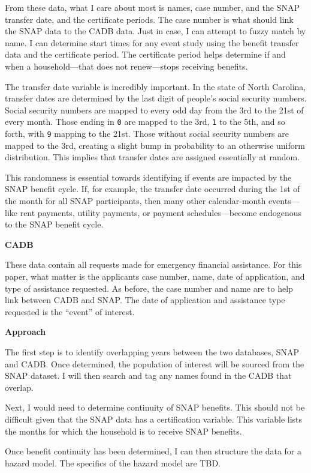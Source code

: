 \documentclass[12pt,letterpaperpaper,]{book}
\begin{document}
From these data, what I care about most is names, case number, and the
SNAP transfer date, and the certificate periods. The case number is what
should link the SNAP data to the CADB data. Just in case, I can attempt
to fuzzy match by name. I can determine start times for any event study
using the benefit transfer data and the certificate period. The
certificate period helps determine if and when a household---that does
not renew---stops receiving benefits.

The transfer date variable is incredibly important. In the state of
North Carolina, transfer dates are determined by the last digit of
people's social security numbers. Social security numbers are mapped to
every odd day from the 3rd to the 21st of every month. Those ending in
\texttt{0} are mapped to the 3rd, \texttt{1} to the 5th, and so forth,
with \texttt{9} mapping to the 21st. Those without social security
numbers are mapped to the 3rd, creating a slight bump in probability to
an otherwise uniform distribution. This implies that transfer dates are
assigned essentially at random.

This randomness is essential towards identifying if events are impacted
by the SNAP benefit cycle. If, for example, the transfer date occurred
during the 1st of the month for all SNAP participants, then many other
calendar-month events---like rent payments, utility payments, or payment
schedules---become endogenous to the SNAP benefit cycle.

\textbf{CADB}

These data contain all requests made for emergency financial assistance.
For this paper, what matter is the applicants case number, name, date of
application, and type of assistance requested. As before, the case
number and name are to help link between CADB and SNAP. The date of
application and assistance type requested is the ``event'' of interest.

\textbf{Approach}

The first step is to identify overlapping years between the two
databases, SNAP and CADB. Once determined, the population of interest
will be sourced from the SNAP dataset. I will then search and tag any
names found in the CADB that overlap.

Next, I would need to determine continuity of SNAP benefits. This should
not be difficult given that the SNAP data has a certification variable.
This variable lists the months for which the household is to receive
SNAP benefits.

Once benefit continuity has been determined, I can then structure the
data for a hazard model. The specifics of the hazard model are TBD.
\end{document}
